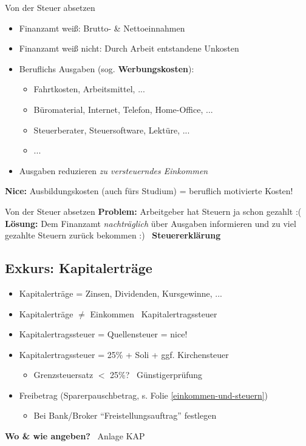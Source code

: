 \documentclass{beamer}
\begin{document}
			\begin{frame}{Von der Steuer absetzen}
				\begin{itemize}
					\item Finanzamt weiß: Brutto- \& Nettoeinnahmen
					\item Finanzamt weiß nicht: Durch Arbeit entstandene Unkosten
					\pause
					\item Beruflichs Ausgaben (sog. \textbf{Werbungskosten}):
					\begin{itemize}
						\item Fahrtkosten, Arbeitsmittel, ...
						\item Büromaterial, Internet, Telefon, Home-Office, ...
						\item Steuerberater, Steuersoftware, Lektüre, ...
						\item ...
					\end{itemize}
					\item Ausgaben reduzieren \textit{zu versteuerndes Einkommen}
				\end{itemize}\n\pause
				
				\textbf{Nice:} Ausbildungskosten (auch fürs Studium) = beruflich motivierte Kosten!
			\end{frame}
				
			\begin{frame}{Von der Steuer absetzen}
				\textbf{Problem:} Arbeitgeber hat Steuern ja schon gezahlt :(\n
				\textbf{Lösung:} Dem Finanzamt \textit{nachträglich} über Ausgaben informieren und zu viel gezahlte Steuern zurück bekommen  :)\n
				\textrightarrow\ \textbf{Steuererklärung}
			\end{frame}
		
		\subsection{Exkurs: Kapitalerträge}
		
			\begin{frame}
				\begin{itemize}
					\item Kapitalerträge = Zinsen, Dividenden, Kursgewinne, ...
					\item Kapitalerträge $\neq$ Einkommen \textrightarrow\ Kapitalertragssteuer\pause
					\item Kapitalertragssteuer = Quellensteuer = nice!
					\item Kapitalertragssteuer = 25\% + Soli + ggf. Kirchensteuer
					\begin{itemize}
						\item Grenzsteuersatz $<$ 25\%? \textrightarrow\ Günstigerprüfung
					\end{itemize}\pause
					\item Freibetrag (Sparerpauschbetrag, s. Folie \ref{einkommen-und-steuern})
					\begin{itemize}
						\item Bei Bank/Broker "`Freistellungsauftrag"' festlegen
					\end{itemize}
				\end{itemize}\n
				\textbf{Wo \& wie angeben?} \textrightarrow\ Anlage KAP
			\end{frame}
		
\end{document}
